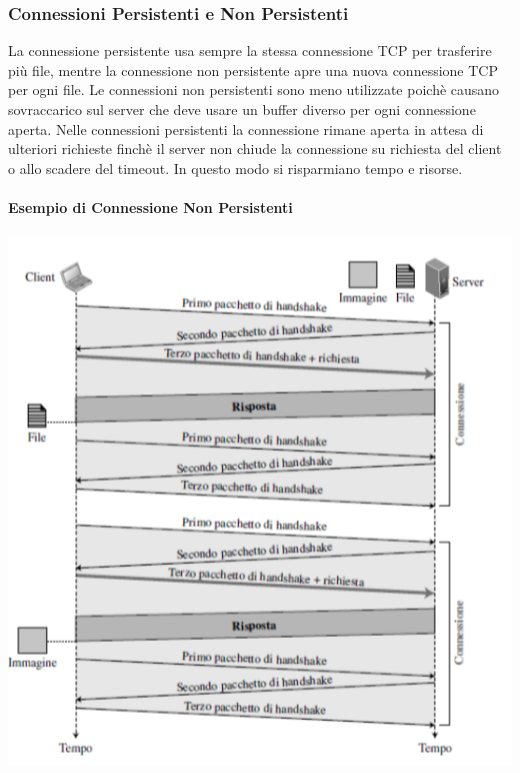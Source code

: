 \documentclass[12pt]{report}
\begin{document}
	\subsubsection{Connessioni Persistenti e Non Persistenti}
	La connessione persistente usa sempre la stessa connessione TCP per trasferire più file, mentre la connessione non persistente apre una nuova connessione TCP per ogni file. Le connessioni non persistenti sono meno utilizzate poichè causano sovraccarico sul server che deve usare un buffer diverso per ogni connessione aperta. Nelle connessioni persistenti la connessione rimane aperta in attesa di ulteriori richieste finchè il server non chiude la connessione su richiesta del client o allo scadere del timeout. In questo modo si risparmiano tempo e risorse.
	\newpage
	\paragraph{Esempio di Connessione Non Persistenti}
	\begin{center}
		\includegraphics[scale=0.5]{assets/non-persistent.png}
	\end{center}
\end{document}
